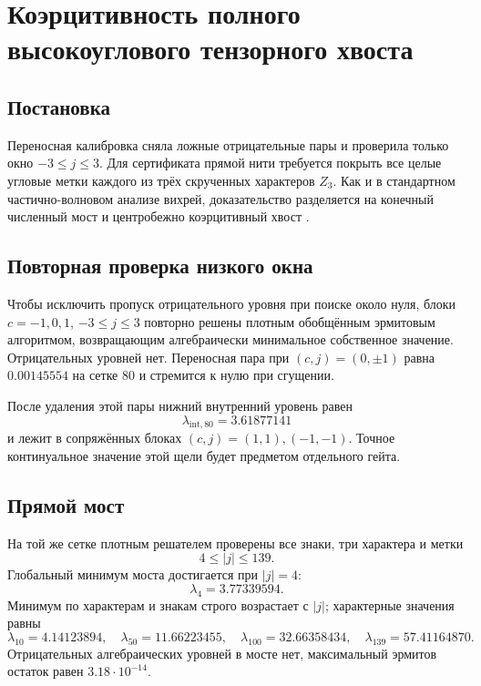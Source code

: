 \chapter{Коэрцитивность полного высокоуглового тензорного хвоста}
\label{ch:v6-bosonic-defect-full-tensor-high-angular-coercivity-gate}

\section{Постановка}

Переносная калибровка сняла ложные отрицательные пары и проверила только
окно $-3\le j\le3$. Для сертификата прямой нити требуется покрыть все
целые угловые метки каждого из трёх скрученных характеров $Z_3$. Как и в
стандартном частично-волновом анализе вихрей, доказательство разделяется на
конечный численный мост и центробежно коэрцитивный хвост
\cite{full-tensor-high-angular-baacke}.

\section{Повторная проверка низкого окна}

Чтобы исключить пропуск отрицательного уровня при поиске около нуля, блоки
$c=-1,0,1$, $-3\le j\le3$ повторно решены плотным обобщённым эрмитовым
алгоритмом, возвращающим алгебраически минимальное собственное значение.
Отрицательных уровней нет. Переносная пара при $(c,j)=(0,\pm1)$ равна
$0.00145554$ на сетке $80$ и стремится к нулю при сгущении.

После удаления этой пары нижний внутренний уровень равен
\begin{equation}
 \lambda_{\mathrm{int},80}=3.61877141
\end{equation}
и лежит в сопряжённых блоках $(c,j)=(1,1),(-1,-1)$. Точное континуальное
значение этой щели будет предметом отдельного гейта.

\section{Прямой мост}

На той же сетке плотным решателем проверены все знаки, три характера и
метки
\begin{equation}
 4\le |j|\le139.
\end{equation}
Глобальный минимум моста достигается при $|j|=4$:
\begin{equation}
 \lambda_{4}=3.77339594.
\end{equation}
Минимум по характерам и знакам строго возрастает с $|j|$; характерные
значения равны
\begin{equation}
 \lambda_{10}=4.14123894,
 \quad
 \lambda_{50}=11.66223455,
 \quad
 \lambda_{100}=32.66358434,
 \quad
 \lambda_{139}=57.41164870.
\end{equation}
Отрицательных алгебраических уровней в мосте нет, максимальный эрмитов
остаток равен $3.18\cdot10^{-14}$.

